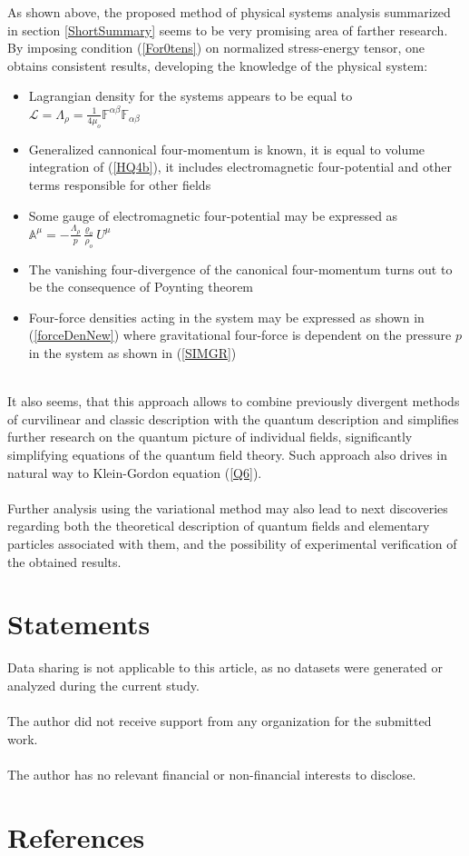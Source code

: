 \documentclass[aps,prx,preprint,groupedaddress,showkeys]{revtex4-2}
\begin{document}
As shown above, the proposed method of physical systems analysis summarized in section \ref{ShortSummary} seems to be very promising area of farther research. By imposing condition (\ref{For0tens}) on normalized stress-energy tensor, one obtains consistent results, developing the knowledge of the physical system:
\begin{itemize}
  \item Lagrangian density for the systems appears to be equal to $\mathcal{L} = \Lambda_{\rho} = \frac{1}{4\mu_o} \mathbb{F}^{\alpha \beta} \mathbb{F}_{\alpha \beta} $
  \item Generalized cannonical four-momentum is known, it is equal to volume integration of (\ref{HQ4b}), it includes electromagnetic four-potential and other terms responsible for other fields
  \item Some gauge of electromagnetic four-potential may be expressed as $\mathbb{A}^{\mu} = - \frac{\Lambda_{\rho}}{p} \frac{\varrho_o}{\rho_o} U^{\mu}$
  \item The vanishing four-divergence of the canonical four-momentum turns out to be the consequence of Poynting theorem
  \item Four-force densities acting in the system may be expressed as shown in (\ref{forceDenNew}) where gravitational four-force is dependent on the pressure $p$ in the system as shown in (\ref{SIMGR}) 
\end{itemize}
~\\
It also seems, that this approach allows to combine previously divergent methods of curvilinear and classic description with the quantum description and simplifies further research on the quantum picture of individual fields, significantly simplifying equations of the quantum field theory. Such approach also drives in natural way to Klein-Gordon equation (\ref{Q6}).\\
~\\
Further analysis using the variational method may also lead to next discoveries regarding both the theoretical description of quantum fields and elementary particles associated with them, and the possibility of experimental verification of the obtained results.

\section{Statements} \label{4Chap}

Data sharing is not applicable to this article, as no datasets were generated or analyzed during the current study.\\
~\\
The author did not receive support from any organization for the submitted work.\\
~\\
The author has no relevant financial or non-financial interests to disclose.\\


\section*{References}


\end{document}

